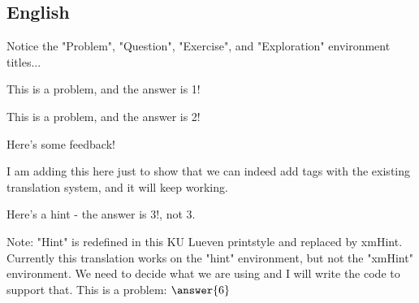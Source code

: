 \documentclass{ximera}
\begin{document}
    
    \subsection*{English}
        
        Notice the "Problem", "Question", "Exercise", and "Exploration" environment titles... 
        \begin{problem}%
            This is a problem, and the answer is 1! %
            \begin{multipleChoice}
            \end{multipleChoice}%
        \end{problem}
            
        \begin{question}
            This is a problem, and the answer is 2! %
            \begin{selectAll}
            \end{selectAll}%
            \begin{feedback}
                Here's some feedback!
            \end{feedback}
            \begin{feedback}[correct]
                I am adding this here just to show that we can indeed add tags with the existing translation system, and it will keep working.%
            \end{feedback}
        \end{question}
            
        \begin{exercise}
            \begin{hint}
                Here's a hint - the answer is 3!, not 3.
            \end{hint}
            Note: "Hint" is redefined in this KU Lueven printstyle and replaced by xmHint. Currently this translation works on the "hint" environment, but not the "xmHint" environment. We need to decide what we are using and I will write the code to support that.
            This is a problem: $\answer{6}$
        \end{exercise}
            
\end{document}
